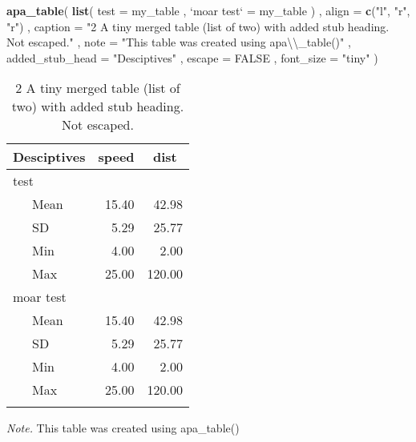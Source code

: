 \documentclass[english,man]{apa6}
\newenvironment{Shaded}{\begin{snugshade}}{\end{snugshade}}
\newcommand{\CharTok}[1]{\textcolor[rgb]{0.31,0.60,0.02}{#1}}
\newcommand{\DataTypeTok}[1]{\textcolor[rgb]{0.13,0.29,0.53}{#1}}
\newcommand{\KeywordTok}[1]{\textcolor[rgb]{0.13,0.29,0.53}{\textbf{#1}}}
\newcommand{\NormalTok}[1]{#1}
\newcommand{\OtherTok}[1]{\textcolor[rgb]{0.56,0.35,0.01}{#1}}
\newcommand{\StringTok}[1]{\textcolor[rgb]{0.31,0.60,0.02}{#1}}
\begin{document}
\begin{Shaded}
\begin{Highlighting}[]
\KeywordTok{apa_table}\NormalTok{(}
  \KeywordTok{list}\NormalTok{(}
    \DataTypeTok{test =}\NormalTok{ my_table}
\NormalTok{    , }\StringTok{`}\DataTypeTok{moar test}\StringTok{`}\NormalTok{ =}\StringTok{ }\NormalTok{my_table}
\NormalTok{  )}
\NormalTok{  , }\DataTypeTok{align =} \KeywordTok{c}\NormalTok{(}\StringTok{"l"}\NormalTok{, }\StringTok{"r"}\NormalTok{, }\StringTok{"r"}\NormalTok{)}
\NormalTok{  , }\DataTypeTok{caption =} \StringTok{"2 A tiny merged table (list of two) with added stub heading. Not escaped."}
\NormalTok{  , }\DataTypeTok{note =} \StringTok{"This table was created using apa}\CharTok{\textbackslash{}\textbackslash{}}\StringTok{_table()"}
\NormalTok{  , }\DataTypeTok{added_stub_head =} \StringTok{"Desciptives"}
\NormalTok{  , }\DataTypeTok{escape =} \OtherTok{FALSE}
\NormalTok{  , }\DataTypeTok{font_size =} \StringTok{"tiny"}
\NormalTok{)}
\end{Highlighting}
\end{Shaded}

\begin{table}[tbp]

\begin{center}
\begin{threeparttable}

\caption{\label{tab:unnamed-chunk-4}2 A tiny merged table (list of two) with added stub heading. Not escaped.}

\tiny{

\begin{tabular}{lrr}
\toprule
Desciptives & \multicolumn{1}{c}{speed} & \multicolumn{1}{c}{dist}\\
\midrule
test &  & \\
\ \ \ Mean & 15.40 & 42.98\\
\ \ \ SD & 5.29 & 25.77\\
\ \ \ Min & 4.00 & 2.00\\
\ \ \ Max & 25.00 & 120.00\\
moar test &  & \\
\ \ \ Mean & 15.40 & 42.98\\
\ \ \ SD & 5.29 & 25.77\\
\ \ \ Min & 4.00 & 2.00\\
\ \ \ Max & 25.00 & 120.00\\
\bottomrule
\addlinespace
\end{tabular}

}

\begin{tablenotes}[para]
\normalsize{\textit{Note.} This table was created using apa\_table()}
\end{tablenotes}

\end{threeparttable}
\end{center}

\end{table}
\end{document}
